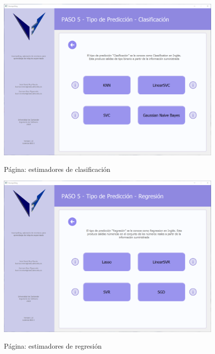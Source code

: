 \begin{figure}[H]
    \centering
    \caption{Página: estimadores de clasificación}
    \includegraphics[width=\textwidth]{images/classificationestimator.png}
    \label{fig:classificationestimators}
\end{figure}

\begin{figure}[H]
    \centering
    \caption{Página: estimadores de regresión}
    \includegraphics[width=\textwidth]{images/regressionestimator.png}
    \label{fig:regressionestimators}
\end{figure}

